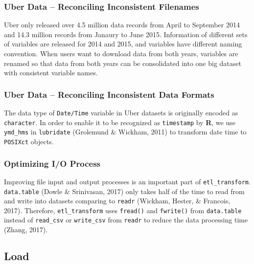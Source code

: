 \documentclass[12pt,twoside]{reedthesis}
\theoremstyle{definition}
\theoremstyle{definition}
\theoremstyle{definition}
\theoremstyle{remark}
\begin{document}
\subsubsection{Uber Data -- Reconciling Inconsistent
Filenames}\label{uber-data-reconciling-inconsistent-filenames}

Uber only released over 4.5 million data records from April to September
2014 and 14.3 million records from Janaury to June 2015. Information of
different sets of variables are released for 2014 and 2015, and
variables have different naming convention. When users want to download
data from both years, variables are renamed so that data from both years
can be consolidated into one big dataset with consistent variable names.

\subsubsection{Uber Data -- Reconciling Inconsistent Data
Formats}\label{uber-data-reconciling-inconsistent-data-formats}

The data type of \texttt{Date/Time} variable in Uber datasets is
originally encoded as \texttt{character}. In order to enable it to be
recognized as \texttt{timestamp} by \textbf{R}, we use \texttt{ymd\_hms}
in \texttt{lubridate} (Grolemund \& Wickham, 2011) to transform date
time to \texttt{POSIXct} objects.

\subsubsection{Optimizing I/O Process}\label{optimizing-io-process}

Improving file input and output processes is an important part of
\texttt{etl\_transform}. \texttt{data.table} (Dowle \& Srinivasan, 2017)
only takes half of the time to read from and write into datasets
comparing to \texttt{readr} (Wickham, Hester, \& Francois, 2017).
Therefore, \texttt{etl\_transform} uses \texttt{fread()} and
\texttt{fwrite()} from \texttt{data.table} instead of \texttt{read\_csv}
or \texttt{write\_csv} from \texttt{readr} to reduce the data processing
time (Zhang, 2017).

\subsection{Load}\label{load}
\end{document}
